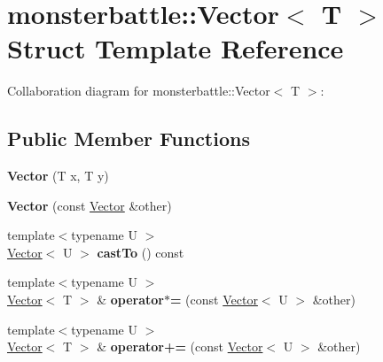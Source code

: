 \hypertarget{structmonsterbattle_1_1Vector}{}\section{monsterbattle\+:\+:Vector$<$ T $>$ Struct Template Reference}
\label{structmonsterbattle_1_1Vector}


Collaboration diagram for monsterbattle\+:\+:Vector$<$ T $>$\+:
\subsection*{Public Member Functions}
\begin{DoxyCompactItemize}
\item 
\mbox{\label{structmonsterbattle_1_1Vector_a7f393c926a963f4a3b968f18529e9758}} 
{\bfseries Vector} (T x, T y)
\item 
\mbox{\label{structmonsterbattle_1_1Vector_aa412f42b9f70a457e852cca2b9b64db2}} 
{\bfseries Vector} (const \hyperlink{structmonsterbattle_1_1Vector}{Vector} \&other)
\item 
\mbox{\label{structmonsterbattle_1_1Vector_a6782e0d924e9a70ce78c7b21e261bde8}} 
{\footnotesize template$<$typename U $>$ }\\\hyperlink{structmonsterbattle_1_1Vector}{Vector}$<$ U $>$ {\bfseries cast\+To} () const
\item 
\mbox{\label{structmonsterbattle_1_1Vector_ac3901e9e5cb2ad0a954cf98b40be635e}} 
{\footnotesize template$<$typename U $>$ }\\\hyperlink{structmonsterbattle_1_1Vector}{Vector}$<$ T $>$ \& {\bfseries operator$\ast$=} (const \hyperlink{structmonsterbattle_1_1Vector}{Vector}$<$ U $>$ \&other)
\item 
\mbox{\label{structmonsterbattle_1_1Vector_a8cecd212a24f7c2547228e9d2af7f962}} 
{\footnotesize template$<$typename U $>$ }\\\hyperlink{structmonsterbattle_1_1Vector}{Vector}$<$ T $>$ \& {\bfseries operator+=} (const \hyperlink{structmonsterbattle_1_1Vector}{Vector}$<$ U $>$ \&other)
\item 

\end{DoxyCompactItemize}
